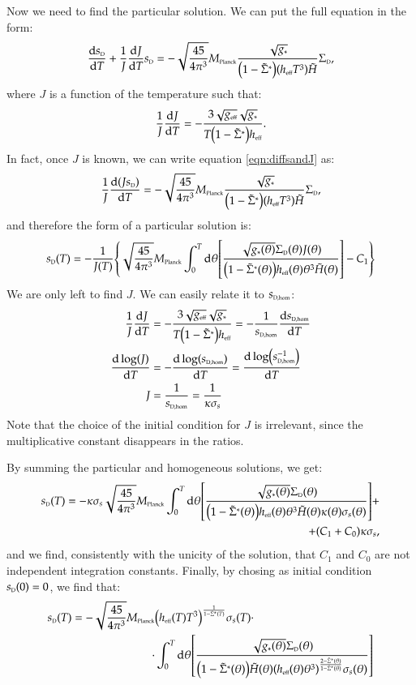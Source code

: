 Now we need to find the particular solution. We can put
the full equation in the form:
\begin{align}\label{eqn:diffsandJ}
 \dv{s_{\scriptscriptstyle{\textrm{D}}}}{T} + \frac{1}{J}\dv{J}{T}s_{\scriptscriptstyle{\textrm{D}}}=- \sqrt{\frac{45}{4 \pi^3}}M_{\scriptscriptstyle{\textrm{Planck}}} \frac{\sqrt{g_\ast}}{\qty(1 - \tilde\Sigma^\ast)\qty(h_{\scriptscriptstyle{\textrm{eff}}} T^3) \tilde H}\Sigma_{\scriptscriptstyle{\textrm{D}}},
\end{align}
where $J$ is a function of the temperature such that:
\begin{align}\label{eqn:diffJ}
 \frac{1}{J}\dv{J}{T}=-\frac{3 \sqrt{{g_{\scriptscriptstyle{\textrm{eff}}}}}\sqrt{g_\ast}}{T\qty(1 - \tilde\Sigma^\ast)h_{\scriptscriptstyle{\textrm{eff}}} }.
\end{align}
In fact, once $J$ is known, we can write equation \eqref{eqn:diffsandJ} as:
\begin{align}
 \frac{1}{J}\dv{(Js_{\scriptscriptstyle{\textrm{D}}})}{T} =- \sqrt{\frac{45}{4 \pi^3}}M_{\scriptscriptstyle{\textrm{Planck}}} \frac{\sqrt{g_\ast}}{\qty(1 - \tilde\Sigma^\ast)\qty(h_{\scriptscriptstyle{\textrm{eff}}} T^3) \tilde H}\Sigma_{\scriptscriptstyle{\textrm{D}}},
\end{align}
and therefore the form of a particular solution is:
\begin{equation}\label{eqn:particularsD}
   s_{\scriptscriptstyle{\textrm{D}}}(T) = - \frac{1}{J(T)}\qty{\sqrt{\frac{45}{4 \pi^3}}M_{\scriptscriptstyle{\textrm{Planck}}}\int^T_{0} \dd \theta
 \qty[\frac{\sqrt{g_\ast(\theta)}\Sigma_{\scriptscriptstyle{\textrm{D}}}(\theta)J(\theta)}{\qty(1 - \tilde\Sigma^\ast(\theta))h_{\scriptscriptstyle{\textrm{eff}}}(\theta)\theta^3\tilde H(\theta)} ] - C_1}
\end{equation}
We are only left to find $J$. We can easily relate it to $s_{\scriptscriptstyle{\textrm{D,hom}}}$:
\begin{align}
 \frac{1}{J}\dv{J}{T}&=-\frac{3 \sqrt{{g_{\scriptscriptstyle{\textrm{eff}}}}}\sqrt{g_\ast}}{T\qty(1 - \tilde\Sigma^\ast)h_{\scriptscriptstyle{\textrm{eff}}} } = -\frac{1}{s_{\scriptscriptstyle{\textrm{D,hom}}}}\dv{s_{\scriptscriptstyle{\textrm{D,hom}}}}{T} \\
  \dv{\log(J)}{T} &=- \dv{\log(s_{\scriptscriptstyle{\textrm{D,hom}}})}{T}= \dv{\log(s_{\scriptscriptstyle{\textrm{D,hom}}}^{-1})}{T}\\
  J &= \frac{1}{s_{\scriptscriptstyle{\textrm{D,hom}}}} = \frac{1}{\kappa \sigma_s}
\end{align}
Note that the choice of the initial condition for $J$ is irrelevant, since the multiplicative constant disappears in the ratios.

By summing the particular and homogeneous solutions, we get:
\begin{equation}
\begin{split}
     s_{\scriptscriptstyle{\textrm{D}}}(T) = - \kappa\sigma_s \sqrt{\frac{45}{4 \pi^3}}M_{\scriptscriptstyle{\textrm{Planck}}} \int^T_{0} \dd \theta
 \qty[\frac{\sqrt{g_\ast(\theta)}\Sigma_{\scriptscriptstyle{\textrm{D}}}(\theta)}{\qty(1 - \tilde\Sigma^\ast(\theta))h_{\scriptscriptstyle{\textrm{eff}}}(\theta)\theta^3\tilde H(\theta)\kappa(\theta)\sigma_s(\theta)} ] +\\
 + (C_1 + C_0)\kappa\sigma_s,
\end{split}
\end{equation}
and we find, consistently with the unicity of the solution, that $C_1$ and $C_0$ are not independent integration constants. Finally, by chosing as initial condition $s_{\scriptscriptstyle{\textrm{D}}}(0)=0$, we find that:
\begin{align}
    s_{\scriptscriptstyle{\textrm{D}}}(T) = - \sqrt{\frac{45}{4 \pi^3}}M_{\scriptscriptstyle{\textrm{Planck}}} &\qty(h_{\scriptscriptstyle{\textrm{eff}}}(T) T^3)^\frac{1}{1 - \tilde\Sigma^\ast(T)} \sigma_s(T) \cdot  \\
    \cdot &\int^T_{0} \dd \theta
 \qty[\frac{\sqrt{g_\ast(\theta)}\Sigma_{\scriptscriptstyle{\textrm{D}}}(\theta)}{\qty(1 - \tilde\Sigma^\ast(\theta))\tilde H(\theta)\qty(h_{\scriptscriptstyle{\textrm{eff}}}(\theta) \theta^3)^\frac{2- \tilde\Sigma^\ast(\theta)}{1 - \tilde\Sigma^\ast(\theta)}\sigma_s(\theta)} ]
\end{align}



